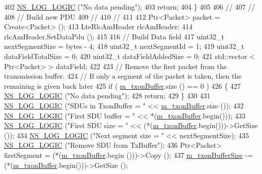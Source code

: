 \begin{DoxyCode}
402       \hyperlink{group__logging_ga88acd260151caf2db9c0fc84997f45ce}{NS\_LOG\_LOGIC} (\textcolor{stringliteral}{"No data pending"});
403       \textcolor{keywordflow}{return};
404     \}
405 
406   \textcolor{comment}{//}
407   \textcolor{comment}{//}
408   \textcolor{comment}{// Build new PDU}
409   \textcolor{comment}{//}
410   \textcolor{comment}{//}
411 
412   Ptr<Packet> packet = Create<Packet> ();
413   LteRlcAmHeader rlcAmHeader;
414   rlcAmHeader.SetDataPdu ();
415 
416   \textcolor{comment}{// Build Data field}
417   uint32\_t nextSegmentSize = bytes - 4;
418   uint32\_t nextSegmentId = 1;
419   uint32\_t dataFieldTotalSize = 0;
420   uint32\_t dataFieldAddedSize = 0;
421   std::vector < Ptr<Packet> > dataField;
422 
423   \textcolor{comment}{// Remove the first packet from the transmission buffer.}
424   \textcolor{comment}{// If only a segment of the packet is taken, then the remaining is given back later}
425   \textcolor{keywordflow}{if} ( \hyperlink{classns3_1_1LteRlcAm_ad8ba4549a7c78cfe0e528d2e9cc465f8}{m\_txonBuffer}.size () == 0 )
426     \{
427       \hyperlink{group__logging_ga88acd260151caf2db9c0fc84997f45ce}{NS\_LOG\_LOGIC} (\textcolor{stringliteral}{"No data pending"});
428       \textcolor{keywordflow}{return};
429     \}
430 
431   \hyperlink{group__logging_ga88acd260151caf2db9c0fc84997f45ce}{NS\_LOG\_LOGIC} (\textcolor{stringliteral}{"SDUs in TxonBuffer  = "} << \hyperlink{classns3_1_1LteRlcAm_ad8ba4549a7c78cfe0e528d2e9cc465f8}{m\_txonBuffer}.size ());
432   \hyperlink{group__logging_ga88acd260151caf2db9c0fc84997f45ce}{NS\_LOG\_LOGIC} (\textcolor{stringliteral}{"First SDU buffer  = "} << *(\hyperlink{classns3_1_1LteRlcAm_ad8ba4549a7c78cfe0e528d2e9cc465f8}{m\_txonBuffer}.begin()));
433   \hyperlink{group__logging_ga88acd260151caf2db9c0fc84997f45ce}{NS\_LOG\_LOGIC} (\textcolor{stringliteral}{"First SDU size    = "} << (*(\hyperlink{classns3_1_1LteRlcAm_ad8ba4549a7c78cfe0e528d2e9cc465f8}{m\_txonBuffer}.begin()))->GetSize ());
434   \hyperlink{group__logging_ga88acd260151caf2db9c0fc84997f45ce}{NS\_LOG\_LOGIC} (\textcolor{stringliteral}{"Next segment size = "} << nextSegmentSize);
435   \hyperlink{group__logging_ga88acd260151caf2db9c0fc84997f45ce}{NS\_LOG\_LOGIC} (\textcolor{stringliteral}{"Remove SDU from TxBuffer"});
436   Ptr<Packet> firstSegment = (*(\hyperlink{classns3_1_1LteRlcAm_ad8ba4549a7c78cfe0e528d2e9cc465f8}{m\_txonBuffer}.begin ()))->Copy ();
437   \hyperlink{classns3_1_1LteRlcAm_a3e8db6b5bc1d3fcc215d554e8d347eda}{m\_txonBufferSize} -= (*(\hyperlink{classns3_1_1LteRlcAm_ad8ba4549a7c78cfe0e528d2e9cc465f8}{m\_txonBuffer}.begin()))->GetSize ();

\end{DoxyCode}
